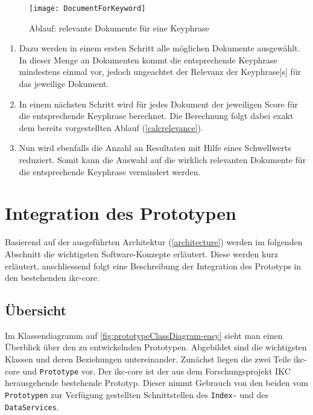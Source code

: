     \begin{figure}[H]
    \centering
    \texttt{[image: DocumentForKeyword]}
    \caption{Ablauf: relevante Dokumente für eine \gls{Keyphrase}}
    \label{fig:seqdocforkeyword}
    \end{figure}
\begin{enumerate}
    \item Dazu werden in einem ersten Schritt alle möglichen Dokumente ausgewählt. In dieser Menge an Dokumenten kommt die entsprechende \gls{Keyphrase} mindestens einmal vor, jedoch ungeachtet der Relevanz der \gls{Keyphrase}[s] für das jeweilige Dokument.
    \item In einem nächsten Schritt wird für jedes Dokument der jeweiligen \gls{Score} für die entsprechende \gls{Keyphrase} berechnet. Die Berechnung folgt dabei exakt dem bereits vorgestellten Ablauf (\autoref{calcrelevance}).

    \item Nun wird ebenfalls die Anzahl an Resultaten mit Hilfe eines Schwellwerts reduziert. Somit kann die Auswahl auf die wirklich relevanten Dokumente für die entsprechende \gls{Keyphrase} vermindert werden.
            
\end{enumerate}


\section{Integration des Prototypen}


Basierend auf der ausgeführten Architektur (\autoref{architecture}) werden im folgenden Abschnitt die wichtigsten Software-Konzepte erläutert. Diese werden kurz erläutert, anschliessend folgt eine Beschreibung der Integration des Prototyps in den bestehenden \gls{ikc-core}.


\subsection{Übersicht}



Im Klassendiagramm auf \autoref{fig:prototypeClassDiagram-easy} sieht man einen Überblick über den zu entwickelnden Prototypen. Abgebildet sind die wichtigsten Klassen und deren Beziehungen untereinander. Zunächst liegen die zwei Teile \gls{ikc-core} und \texttt{Prototype} vor. Der \gls{ikc-core} ist der aus dem Forschungsprojekt \gls{IKC} herausgehende bestehende Prototyp. Dieser nimmt Gebrauch von den beiden vom \texttt{Prototypen} zur Verfügung gestellten Schnittstellen des \texttt{Index-} und des \texttt{DataServices}.

